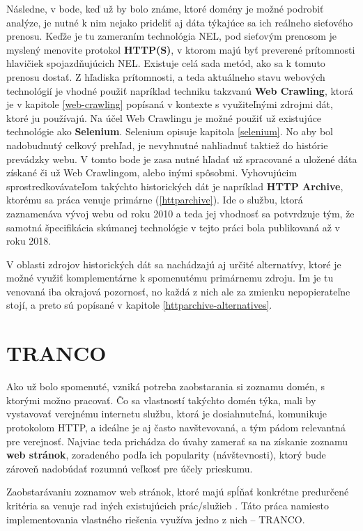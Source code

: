 Následne, v bode, keď už by bolo známe, ktoré domény je možné podrobiť analýze, je nutné k nim nejako prideliť aj dáta týkajúce sa ich reálneho sieťového prenosu. 
Keďže je tu zameraním technológia NEL, pod sieťovým prenosom je myslený menovite protokol \textbf{HTTP(S)}, v ktorom majú byť preverené prítomnosti hlavičiek spojazdňujúcich NEL. Existuje celá sada metód, ako sa k tomuto prenosu dostať. 
Z hľadiska prítomnosti, a teda aktuálneho stavu webových technológií je vhodné použiť napríklad techniku takzvanú \textbf{Web Crawling}, ktorá je v kapitole \ref{web-crawling} popísaná v kontexte s využiteľnými zdrojmi dát, ktoré ju používajú.
Na účel Web Crawlingu je možné použiť už existujúce technológie ako \textbf{Selenium}. 
Selenium opisuje kapitola \ref{selenium}.
No aby bol nadobudnutý celkový prehľad, je nevyhnutné nahliadnuť taktiež do histórie prevádzky webu. 
V tomto bode je zasa nutné hľadať už spracované a uložené dáta získané či už Web Crawlingom, alebo inými spôsobmi. 
Vyhovujúcim sprostredkovávateľom takýchto historických dát je napríklad \textbf{HTTP Archive}, ktorému sa práca venuje primárne (\ref{httparchive}).
Ide o službu, ktorá zaznamenáva vývoj webu od roku 2010 a teda jej vhodnosť sa potvrdzuje tým, že samotná špecifikácia skúmanej technológie v tejto práci bola publikovaná až v roku 2018.

V oblasti zdrojov historických dát sa nachádzajú aj určité alternatívy, ktoré je možné využiť komplementárne k spomenutému primárnemu zdroju.
Im je tu venovaná iba okrajová pozornosť, no každá z nich ale za zmienku nepopierateľne stojí, a preto sú popísané v kapitole \ref{httparchive-alternatives}.


\section{TRANCO}
\label{tranco}

Ako už bolo spomenuté, vzniká potreba zaobstarania si zoznamu domén, s ktorými možno pracovať. Čo sa vlastností takýchto domén týka,
mali by vystavovať verejnému internetu službu, ktorá je dosiahnuteľná, komunikuje protokolom HTTP, a ideálne je aj často navštevovaná,
a tým pádom relevantná pre verejnosť. Najviac teda prichádza do úvahy zamerať sa na získanie zoznamu \textbf{web stránok}, zoradeného podľa
ich popularity (návštevnosti), ktorý bude zároveň nadobúdať rozumnú veľkosť pre účely prieskumu. 

Zaobstarávaniu zoznamov web stránok, ktoré majú spĺňať konkrétne predurčené kritéria sa venuje rad iných existujúcich prác/služieb 
\cite{tranco}\cite{hacker-target-website-lists-overview}. Táto práca namiesto implementovania vlastného riešenia využíva jedno z nich -- TRANCO.

